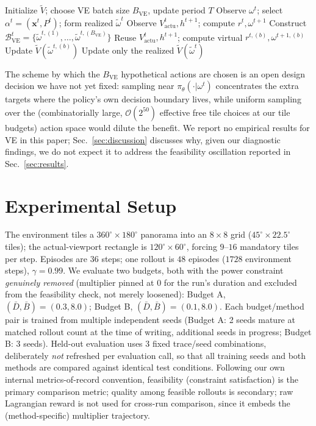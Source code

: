 \documentclass[conference]{IEEEtran}
\newcommand{\mbf}[1]{\mathbf{#1}}
\begin{document}
\begin{algorithm}[t]
\caption{PDS + Virtual Experience}
\label{alg:ve}
\begin{algorithmic}[1]
\State Initialize $\tilde V$; choose VE batch size $B_{\text{VE}}$, update period $T$
  \State Observe $\omega^t$; select $\alpha^t=(\mbf{x}^t,P^t)$; form realized $\tilde\omega^t$
  \State Observe $V^t_{\text{actu}}, h^{t+1}$; compute $r^t, \omega^{t+1}$
    \State Construct $\mathcal{B}_{\text{VE}}^t = \{\tilde\omega^{t,(1)},\dots,\tilde\omega^{t,(B_{\text{VE}})}\}$
      \State Reuse $V^t_{\text{actu}}, h^{t+1}$; compute virtual $r^{t,(b)}, \omega^{t+1,(b)}$
      \State Update $\tilde V(\tilde\omega^{t,(b)})$
    \EndFor
  \Else
    \State Update only the realized $\tilde V(\tilde\omega^t)$
  \EndIf
\EndFor
\end{algorithmic}
\end{algorithm}

The scheme by which the $B_{\text{VE}}$ hypothetical actions are chosen is an open
design decision we have not yet fixed: sampling near $\pi_\theta(\cdot|\omega^t)$
concentrates the extra targets where the policy's own decision boundary lives, while
uniform sampling over the (combinatorially large, $\mathcal{O}(2^{50})$ effective free
tile choices at our tile budgets) action space would dilute the benefit. We report no
empirical results for VE in this paper; Sec.~\ref{sec:discussion} discusses why, given
our diagnostic findings, we do not expect it to address the feasibility oscillation
reported in Sec.~\ref{sec:results}.

\section{Experimental Setup}

The environment tiles a $360^{\circ}{\times}180^{\circ}$ panorama into an $8{\times}8$
grid ($45^{\circ}{\times}22.5^{\circ}$ tiles); the actual-viewport rectangle is
$120^{\circ}{\times}60^{\circ}$, forcing $9$--$16$ mandatory tiles per step. Episodes are
$36$ steps; one rollout is $48$ episodes ($1728$ environment steps), $\gamma{=}0.99$.
We evaluate two budgets, both with the power constraint \emph{genuinely removed}
(multiplier pinned at $0$ for the run's duration and excluded from the feasibility
check, not merely loosened): Budget A, $(\bar D,\bar B){=}(0.3,8.0)$; Budget B,
$(\bar D,\bar B){=}(0.1,8.0)$. Each budget/method pair is trained from multiple
independent seeds (Budget A: 2 seeds mature at matched rollout count at the time of
writing, additional seeds in progress; Budget B: 3 seeds). Held-out evaluation uses
$3$ fixed trace/seed combinations, deliberately \emph{not} refreshed per evaluation
call, so that all training seeds and both methods are compared against identical test
conditions. Following our own internal metrics-of-record convention, feasibility
(constraint satisfaction) is the primary comparison metric; quality among feasible
rollouts is secondary; raw Lagrangian reward is not used for cross-run comparison,
since it embeds the (method-specific) multiplier trajectory.
\end{document}

